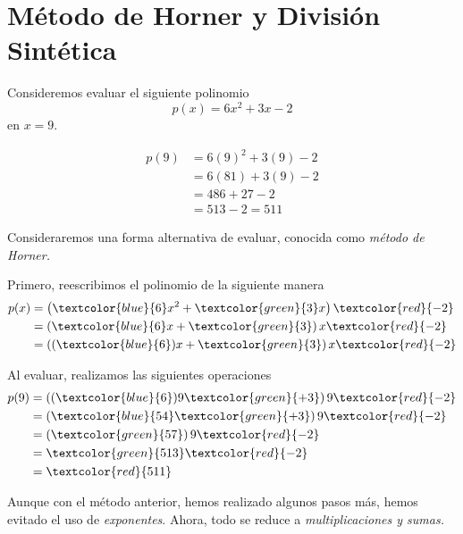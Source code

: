 \section{M\'etodo de Horner y Divisi\'on Sint\'etica}


	\begin{problema}
		Consideremos evaluar el siguiente polinomio
		$$
		p(x)=6x^{2}+3x-2
		$$ en $x=9.$
	\end{problema}
	



	\begin{align*}
		p(9)&=6(9)^{2}+3(9)-2  \\
		&=6(81)+3(9)-2  \\
		&=486+27-2  \\
		&=513-2=511
	\end{align*}
	



	Consideraremos una forma alternativa de evaluar, conocida como \emph{m\'etodo de Horner.}



	Primero, reescribimos el polinomio de la siguiente manera 
	\begin{align*}
		p(x)&=\left( \textcolor{blue}{6}x^{2} + \textcolor{green}{3}x \right) \textcolor{red}{-2}\\
		&= \left( \textcolor{blue}{6}x+\textcolor{green}{3} \right)x\textcolor{red}{-2} \\
		&= \left( (\textcolor{blue}{6}) x + \textcolor{green}{3} \right) x \textcolor{red}{-2}
	\end{align*}
	



	Al evaluar, realizamos las siguientes operaciones
	\begin{align*}
		p(9)&=\left( (\textcolor{blue}{6}) 9  \textcolor{green}{+3} \right) 9 \textcolor{red}{-2}\\
		&=\left( \textcolor{blue}{54} \textcolor{green}{+3} \right)9\textcolor{red}{-2} \\
		&= \left( \textcolor{green}{57} \right)9\textcolor{red}{-2}\\
		&=\textcolor{green}{513}\textcolor{red}{-2}\\
		&=\textcolor{red}{511}
	\end{align*}
	



	\begin{observacion}
		Aunque con el m\'etodo anterior, hemos realizado algunos pasos más, hemos evitado el uso de \emph{exponentes}.  Ahora, todo se reduce a \emph{multiplicaciones y sumas.}
	\end{observacion}
	



